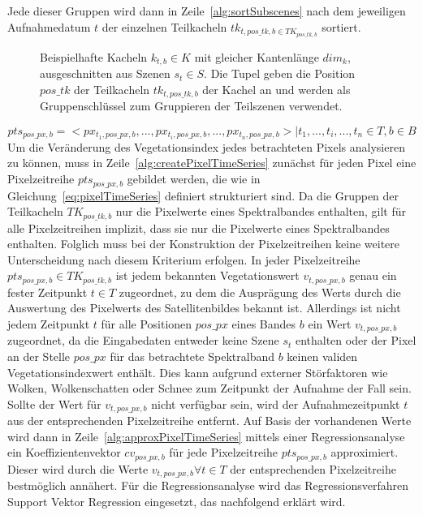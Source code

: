 Jede dieser Gruppen wird dann in Zeile~\ref{alg:sortSubscenes} nach dem jeweiligen Aufnahmedatum $t$ der einzelnen Teilkacheln $tk_{t, pos\_tk, b \in TK_{pos\_tk, b}}$ sortiert. 
%
\begin{figure}[H]
\centering

\caption{Beispielhafte Kacheln $k_{t, b} \in K$ mit gleicher Kantenlänge $dim_k$, ausgeschnitten aus Szenen $s_t \in S$. Die Tupel geben die Position $pos\_tk$ der Teilkacheln $tk_{t, pos\_tk, b}$ der Kachel an und werden als Gruppenschlüssel zum Gruppieren der Teilszenen verwendet.} 
\label{fig:dataCubeSliced}
\end{figure}
%
\begin{equation} \label{eq:pixelTimeSeries}
pts_{pos\_px, b} = <px_{t_1, pos\_px, b}, ..., px_{t_i, pos\_px, b}, ... , px_{t_n, pos\_px, b}> | t_1, ..., t_i, ..., t_n \in T, b\in B
\end{equation}
%
Um die Veränderung des Vegetationsindex jedes betrachteten Pixels analysieren zu können, muss in Zeile~\ref{alg:createPixelTimeSeries} zunächst für jeden Pixel eine Pixelzeitreihe $pts_{pos\_px, b}$ gebildet werden, die wie in Gleichung~\ref{eq:pixelTimeSeries} definiert strukturiert sind. Da die Gruppen der Teilkacheln $TK_{pos\_tk, b}$ nur die Pixelwerte eines Spektralbandes enthalten, gilt für alle Pixelzeitreihen implizit, dass sie nur die Pixelwerte eines Spektralbandes enthalten. Folglich muss bei der Konstruktion der Pixelzeitreihen keine weitere Unterscheidung nach diesem Kriterium erfolgen. In jeder Pixelzeitreihe $pts_{pos\_px, b} \in TK_{pos\_tk, b}$ ist jedem bekannten Vegetationswert $v_{t, pos\_px, b}$ genau ein fester Zeitpunkt $t \in T$ zugeordnet, zu dem die Ausprägung des Werts durch die Auswertung des Pixelwerts des Satellitenbildes bekannt ist. Allerdings ist nicht jedem Zeitpunkt $t$ für alle Positionen $pos\_px$ eines Bandes $b$ ein Wert $v_{t, pos\_px, b}$ zugeordnet, da die Eingabedaten entweder keine Szene $s_t$  enthalten oder der Pixel an der Stelle $pos\_px$ für das betrachtete Spektralband $b$ keinen validen Vegetationsindexwert enthält. Dies kann aufgrund externer Störfaktoren wie Wolken, Wolkenschatten oder Schnee zum Zeitpunkt der Aufnahme der Fall sein. Sollte der Wert für $v_{t, pos\_px, b}$ nicht verfügbar sein, wird der Aufnahmezeitpunkt $t$ aus der entsprechenden Pixelzeitreihe entfernt. Auf Basis der vorhandenen Werte wird dann in Zeile~\ref{alg:approxPixelTimeSeries} mittels einer Regressionsanalyse ein Koeffizientenvektor $cv_{pos\_px, b}$  für jede Pixelzeitreihe $pts_{pos\_px, b}$ approximiert. Dieser wird durch die Werte $v_{t, pos\_px, b} \forall t \in T$ der entsprechenden Pixelzeitreihe bestmöglich annähert. Für die Regressionsanalyse wird das Regressionsverfahren Support Vektor Regression eingesetzt, das nachfolgend erklärt wird. \\

